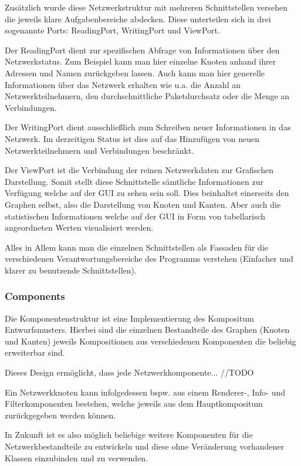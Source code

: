 Zusätzlich wurde diese Netzwerkstruktur mit mehreren Schnittstellen versehen die jeweils klare Aufgabenbereiche abdecken. Diese unterteilen sich in drei sogenannte Ports: ReadingPort, WritingPort und ViewPort.

Der ReadingPort dient zur spezifischen Abfrage von Informationen über den Netzwerkstatus. Zum Beispiel kann man hier einzelne Knoten anhand ihrer Adressen und Namen zurückgeben lassen. Auch kann man hier generelle Informationen über das Netzwerk erhalten wie u.a. die Anzahl an Netzwerkteilnehmern, den durchschnittliche Paketdurchsatz oder die Menge an Verbindungen.

Der WritingPort dient ausschließlich zum Schreiben neuer Informationen in das Netzwerk. Im derzeitigen Status ist dies auf das Hinzufügen von neuen Netzwerkteilnehmern und Verbindungen beschränkt.

Der ViewPort ist die Verbindung der reinen Netzwerkdaten zur Grafischen Darstellung. Somit stellt diese Schnittstelle sämtliche Informationen zur Verfügung welche auf der GUI zu sehen sein soll.
Dies beinhaltet einerseits den Graphen selbst, also die Darstellung von Knoten und Kanten. Aber auch die statistischen Informationen welche auf der GUI in Form von tabellarisch angeordneten Werten visualisiert werden.

Alles in Allem kann man die einzelnen Schnittstellen als Fassaden für die verschiedenen Verantwortungsbereiche des Programms verstehen (Einfacher und klarer zu benutzende Schnittstellen).

\subsubsection{Components}

Die Komponentenstruktur ist eine Implementierung des Kompositum Entwurfsmusters. Hierbei sind die einzelnen Bestandteile des Graphen (Knoten und Kanten) jeweils Kompositionen aus verschiedenen Komponenten die beliebig erweiterbar sind.

Dieses Design ermöglicht, dass jede Netzwerkkomponente... //TODO

Ein Netzwerkknoten kann infolgedessen bspw. aus einem Renderer-, Info- und Filterkomponenten bestehen, welche jeweils aus dem Hauptkompositum zurückgegeben werden können.

In Zukunft ist es also möglich beliebige weitere Komponenten für die Netzwerkbestandteile zu entwickeln und diese ohne Veränderung vorhandener Klassen einzubinden und zu verwenden.



